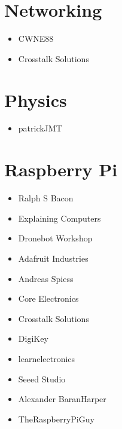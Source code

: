 \documentclass[letterpaper,10pt,english,openany,oneside]{sphinxmanual}
\begin{document}
\section{Networking}
\label{\detokenize{youtube:networking}}\begin{itemize}
\item {} 
\sphinxAtStartPar
CWNE88

\item {} 
\sphinxAtStartPar
Crosstalk Solutions

\end{itemize}


\section{Physics}
\label{\detokenize{youtube:physics}}\begin{itemize}
\item {} 
\sphinxAtStartPar
patrickJMT

\end{itemize}


\section{Raspberry Pi}
\label{\detokenize{youtube:raspberry-pi}}\begin{itemize}
\item {} 
\sphinxAtStartPar
Ralph S Bacon

\item {} 
\sphinxAtStartPar
Explaining Computers

\item {} 
\sphinxAtStartPar
Dronebot Workshop

\item {} 
\sphinxAtStartPar
Adafruit Industries

\item {} 
\sphinxAtStartPar
Andreas Spiess

\item {} 
\sphinxAtStartPar
Core Electronics

\item {} 
\sphinxAtStartPar
Crosstalk Solutions

\item {} 
\sphinxAtStartPar
Digi\sphinxhyphen{}Key

\item {} 
\sphinxAtStartPar
learnelectronics

\item {} 
\sphinxAtStartPar
Seeed Studio

\item {} 
\sphinxAtStartPar
Alexander Baran\sphinxhyphen{}Harper

\item {} 
\sphinxAtStartPar
TheRaspberryPiGuy

\end{itemize}
\end{document}
